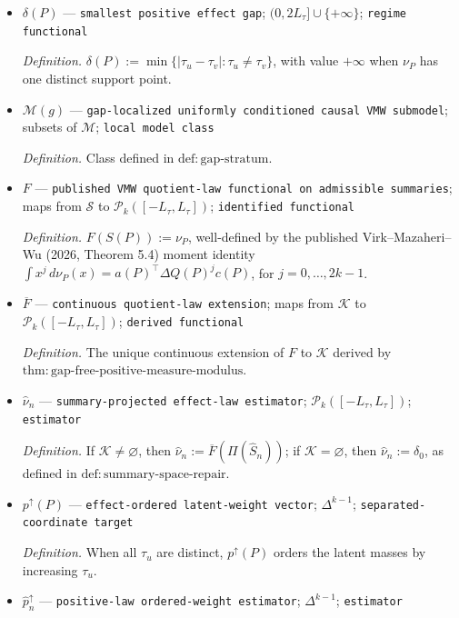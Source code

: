 \documentclass{article}
\begin{document}
\begin{itemize}
  \item \(\delta(P)\) --- \texttt{smallest positive effect gap}; \((0,2L_{\tau}]\cup\{+\infty\}\); \texttt{regime functional}
  \par\smallskip\noindent\emph{Definition.} \(\delta(P):=\min\{|\tau_u-\tau_v|:\tau_u\ne\tau_v\}\), with value \(+\infty\) when \(\nu_P\) has one distinct support point.
  \item \(\mathcal M(g)\) --- \texttt{gap-\allowbreak{}localized uniformly conditioned causal VMW submodel}; subsets of \(\mathcal M\); \texttt{local model class}
  \par\smallskip\noindent\emph{Definition.} Class defined in \(\mathrm{def:gap\text{-}stratum}\).
  \item \(F\) --- \texttt{published VMW quotient-\allowbreak{}law functional on admissible summaries}; maps from \(\mathscr S\) to \(\mathcal P_k([-L_{\tau},L_{\tau}])\); \texttt{identified functional}
  \par\smallskip\noindent\emph{Definition.} \(F(S(P)):=\nu_P\), well-defined by the published Virk--Mazaheri--Wu (2026, Theorem 5.4) moment identity \(\int x^j\,d\nu_P(x)=a(P)^\top\Delta Q(P)^jc(P)\), for \(j=0,\ldots,2k-1\).
  \item \(\overline F\) --- \texttt{continuous quotient-\allowbreak{}law extension}; maps from \(\mathcal K\) to \(\mathcal P_k([-L_{\tau},L_{\tau}])\); \texttt{derived functional}
  \par\smallskip\noindent\emph{Definition.} The unique continuous extension of \(F\) to \(\mathcal K\) derived by \(\mathrm{thm:gap\text{-}free\text{-}positive\text{-}measure\text{-}modulus}\).
  \item \(\widehat\nu_n\) --- \texttt{summary-\allowbreak{}projected effect-\allowbreak{}law estimator}; \(\mathcal P_k([-L_{\tau},L_{\tau}])\); \texttt{estimator}
  \par\smallskip\noindent\emph{Definition.} If \(\mathcal K\ne\varnothing\), then \(\widehat\nu_n:=\overline F(\Pi(\widehat S_n))\); if \(\mathcal K=\varnothing\), then \(\widehat\nu_n:=\delta_0\), as defined in \(\mathrm{def:summary\text{-}space\text{-}repair}\).
  \item \(p^{\uparrow}(P)\) --- \texttt{effect-\allowbreak{}ordered latent-\allowbreak{}weight vector}; \(\Delta^{k-1}\); \texttt{separated-\allowbreak{}coordinate target}
  \par\smallskip\noindent\emph{Definition.} When all \(\tau_u\) are distinct, \(p^{\uparrow}(P)\) orders the latent masses by increasing \(\tau_u\).
  \item \(\widehat p_n^{\uparrow}\) --- \texttt{positive-\allowbreak{}law ordered-\allowbreak{}weight estimator}; \(\Delta^{k-1}\); \texttt{estimator}

\end{itemize}
\end{document}

